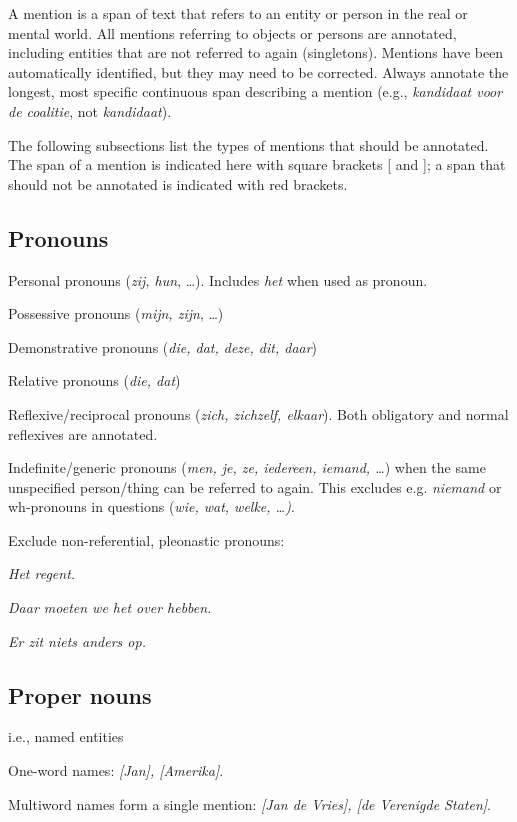 A mention is a span of text that refers to an entity or person in the
real or mental world. All mentions referring to objects or persons are
annotated, including entities that are not referred to again
(singletons). Mentions have been automatically identified, but they may
need to be corrected. Always annotate the longest, most specific
continuous span describing a mention (e.g., \emph{kandidaat voor de
coalitie}, not \emph{kandidaat}).

The following subsections list the types of mentions that should be annotated.
The span of a mention is indicated here with square brackets {[} and {]};
a span that should not be annotated is indicated with \n{[} red brackets\n{]}.

\subsection{Pronouns}
\begin{itemize*}
    \item Personal pronouns (\emph{zij, hun}, \dots).
        Includes \emph{het} when used as pronoun.
    \item Possessive pronouns (\emph{mijn, zijn}, \dots)
    \item Demonstrative pronouns (\emph{die, dat, deze, dit, daar})
    \item Relative pronouns (\emph{die, dat})
    \item Reflexive/reciprocal pronouns (\emph{zich, zichzelf, elkaar}).
        Both obligatory and normal reflexives are annotated.
    \item Indefinite/generic pronouns (\emph{men, je, ze, iedereen, iemand, \dots})
      when the same unspecified person/thing can be referred to again. This
      excludes e.g. \emph{niemand} or wh-pronouns in questions
      (\emph{wie, wat, welke, \dots)}.
\end{itemize*}

Exclude non-referential, pleonastic pronouns:
\begin{itemize*}
   \item \emph{\n{[}Het\n{]} regent.}
   \item \emph{Daar moeten we \n{[}het\n{]} over hebben.}
   \item \emph{\n{[}Er\n{]} zit niets anders op.}
\end{itemize*}


\subsection{Proper nouns}
i.e., named entities
\begin{itemize*}
    \item One-word names: \emph{[Jan], [Amerika]}.
    \item Multiword names form a single mention: \emph{[Jan de Vries], [de Verenigde Staten]}.
\end{itemize*}


